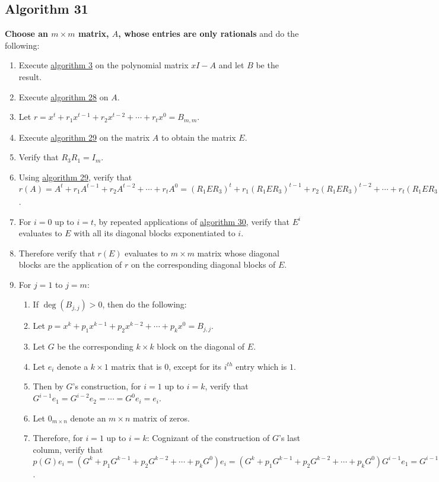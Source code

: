 \documentclass[twocolumn]{article}
\begin{document}
		\subsection{Algorithm 31}\label{sec:algorithm 31}
			\textbf{Choose an $m\times m$ matrix, $A$, whose entries are only rationals} and do the following:
			\begin{enumerate}
				\item Execute \hyperref[sec:algorithm 3]{algorithm 3} on the polynomial matrix $xI-A$ and let $B$ be the result.
				\item Execute \hyperref[sec:algorithm 28]{algorithm 28} on $A$.
				\item Let $r=x^t+r_1x^{t-1}+r_2x^{t-2}+\cdots+r_tx^0=B_{m,m}$.
				\item Execute \hyperref[sec:algorithm 29]{algorithm 29} on the matrix $A$ to obtain the matrix $E$.
				\item Verify that $R_3R_1=I_m$.
				\item Using \hyperref[sec:algorithm 29]{algorithm 29}, verify that $r(A)=A^t+r_1A^{t-1}+r_2A^{t-2}+\cdots+r_tA^0=(R_1ER_3)^t+r_1(R_1ER_3)^{t-1}+r_2(R_1ER_3)^{t-2}+\cdots+r_t(R_1ER_3)^0=R_1(E^t+r_1E^{t-1}+r_2E^{t-2}+\cdots+r_tE^0)R_3=R_1r(E)R_3$.
				\item For $i=0$ up to $i=t$, by repeated applications of \hyperref[sec:algorithm 30]{algorithm 30}, verify that $E^i$ evaluates to $E$ with all its diagonal blocks exponentiated to $i$.
				\item Therefore verify that $r(E)$ evaluates to $m\times m$ matrix whose diagonal blocks are the application of $r$ on the corresponding diagonal blocks of $E$.
				\item For $j=1$ to $j=m$:
				\begin{enumerate}
					\item If $\deg(B_{j,j})>0$, then do the following:
					\item Let $p=x^k+p_1x^{k-1}+p_2x^{k-2}+\cdots+p_kx^0=B_{j,j}$.
					\item Let $G$ be the corresponding $k\times k$ block on the diagonal of $E$.
					\item Let $e_i$ denote a $k\times 1$ matrix that is $0$, except for its $i^{th}$ entry which is $1$.
					\item Then by $G$'s construction, for $i=1$ up to $i=k$, verify that $G^{i-1}e_1=G^{i-2}e_2=\cdots=G^{0}e_i=e_i$.
					\item Let $0_{m\times n}$ denote an $m\times n$ matrix of zeros.
					\item Therefore, for $i=1$ up to $i=k$: Cognizant of the construction of $G$'s last column, verify that $p(G)e_i=(G^k+p_1G^{k-1}+p_2G^{k-2}+\cdots+p_kG^0)e_i=(G^k+p_1G^{k-1}+p_2G^{k-2}+\cdots+p_kG^0)G^{i-1}e_1=G^{i-1}(GG^{k-1}+p_1G^{k-1}+p_2G^{k-2}+\cdots+p_kG^0)e_1=G^{i-1}(Ge_k+p_1e_k+p_2e_{k-1}+\cdots+p_ke_1)=G^{i-1}0_{k\times 1}=0_{k\times 1}$.

\end{enumerate}
\end{enumerate}
\end{document}
